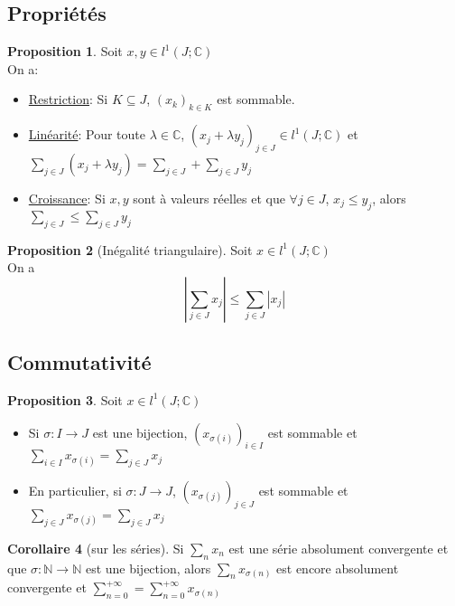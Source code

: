 \documentclass[10pt,a4paper]{article}
\theoremstyle{definition}
\newtheorem{proposition}{Proposition}[section]
\newtheorem{corollaire}[proposition]{Corollaire}
\begin{document}
\subsection{Propriétés}
\begin{proposition}
Soit $x, y \in l^1(J; \mathbb{C})$ \\
On a:
\begin{itemize}
\item \uline{Restriction}: Si $K \subseteq J$, $(x_k)_{k \in K}$ est sommable.
\item \uline{Linéarité}: Pour toute $\lambda \in \mathbb{C}$, $(x_j + \lambda y_j)_{j \in J} \in l^1(J; \mathbb{C})$ et $\sum\limits_{j \in J} (x_j + \lambda y_j) = \sum\limits_{j \in J} + \sum\limits_{j \in J} y_j$
\item \uline{Croissance}: Si $x, y$ sont à valeurs réelles et que $\forall j \in J$, $x_j \leq y_j$, alors $\sum\limits_{j \in J} \leq \sum\limits_{j \in J} y_j$
\end{itemize}
\end{proposition}
\begin{proposition}[Inégalité triangulaire]
Soit $x \in l^1(J; \mathbb{C})$ \\
On a
\[ \left| \sum\limits_{j \in J} x_j \right| \leq \sum\limits_{j \in J} \left| x_j \right|\]
\end{proposition}

\subsection{Commutativité}
\begin{proposition}
Soit $x \in l^1(J; \mathbb{C})$
\begin{itemize}
\item Si $\sigma: I \to J$ est une bijection, $(x_{\sigma(i)})_{i \in I}$ est sommable et $\sum\limits_{i \in I} x_{\sigma(i)} = \sum\limits_{j \in J} x_j$
\item En particulier, si $\sigma: J \to J$, $(x_{\sigma(j)})_{j \in J}$ est sommable et $\sum\limits_{j \in J} x_{\sigma(j)} = \sum\limits_{j \in J} x_j$
\end{itemize}
\end{proposition}
\begin{corollaire}[sur les séries]
Si $\sum\limits_n x_n$ est une série absolument convergente et que $\sigma: \mathbb{N} \to \mathbb{N}$ est une bijection, alors $\sum\limits_n x_{\sigma(n)}$ est encore absolument convergente et $\sum\limits_{n = 0}^{+\infty} = \sum\limits_{n = 0}^{+\infty} x_{\sigma(n)}$
\end{corollaire}
\end{document}
